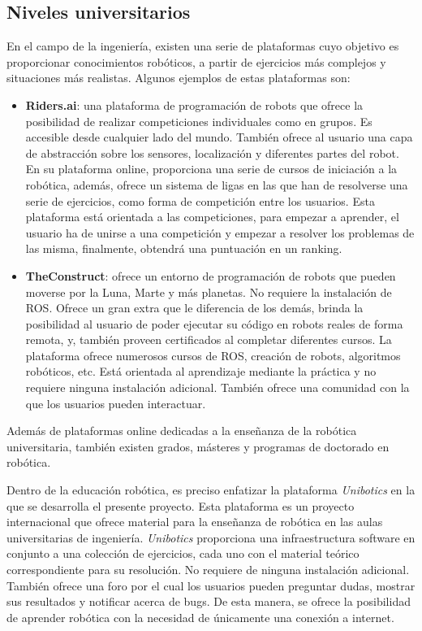 \documentclass[a4paper, 12pt]{book}
\begin{document}
\subsection{Niveles universitarios}

En el campo de la ingeniería, existen una serie de plataformas cuyo objetivo es proporcionar conocimientos robóticos, a partir de ejercicios más complejos y situaciones más realistas. Algunos ejemplos de estas plataformas son:

\begin{itemize}
\item \textbf{Riders.ai}: una plataforma de programación de robots que ofrece la posibilidad de realizar competiciones individuales como en grupos. Es accesible desde cualquier lado del mundo. También ofrece al usuario una capa de abstracción sobre los sensores, localización y diferentes partes del robot. En su plataforma online, proporciona una serie de cursos de iniciación a la robótica, además, ofrece un sistema de ligas en las que han de resolverse una serie de ejercicios, como forma de competición entre los usuarios. Esta plataforma está orientada a las competiciones, para empezar a aprender, el usuario ha de unirse a una competición y empezar a resolver los problemas de las misma, finalmente, obtendrá una puntuación en un ranking.
\item \textbf{TheConstruct}: ofrece un entorno de programación de robots que pueden moverse por la Luna, Marte y más planetas. No requiere la instalación de ROS. Ofrece un gran extra que le diferencia de los demás, brinda la posibilidad al usuario de poder ejecutar su código en robots reales de forma remota, y, también proveen certificados al completar diferentes cursos. La plataforma ofrece numerosos cursos de ROS, creación de robots, algoritmos robóticos, etc. Está orientada al aprendizaje mediante la práctica y no requiere ninguna instalación adicional. También ofrece una comunidad con la que los usuarios pueden interactuar.
\end{itemize}

Además de plataformas online dedicadas a la enseñanza de la robótica universitaria, también existen grados, másteres y programas de doctorado en robótica.

Dentro de la educación robótica, es preciso enfatizar la plataforma \textit{Unibotics} en la que se desarrolla el presente proyecto. Esta plataforma es un proyecto internacional que ofrece material para la enseñanza de robótica en las aulas universitarias de ingeniería. \textit{Unibotics} proporciona una infraestructura software en conjunto a una colección de ejercicios, cada uno con el material teórico correspondiente para su resolución. No requiere de ninguna instalación adicional. También ofrece una foro por el cual los usuarios pueden preguntar dudas, mostrar sus resultados y notificar acerca de bugs. De esta manera, se ofrece la posibilidad de aprender robótica con la necesidad de únicamente una conexión a internet.
\end{document}
